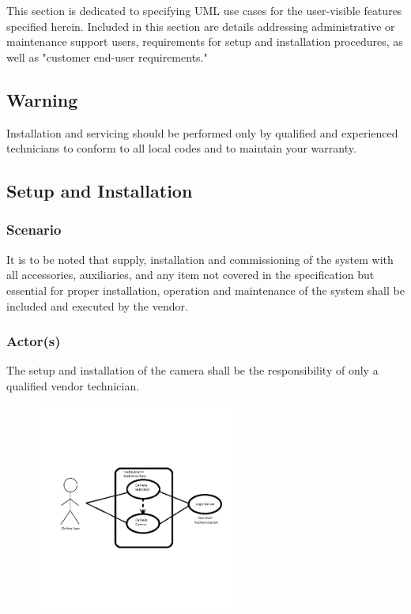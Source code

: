 This section is dedicated to specifying UML use cases for the user-visible features specified herein. Included in this section are details addressing administrative or maintenance support users, requirements for setup and installation procedures, as well as "customer end-user requirements."
\subsection{Warning}
Installation and servicing should be performed only by qualified and experienced technicians to conform to all local codes and to maintain your warranty.
\subsection{Setup and Installation}
\subsubsection{Scenario}
It is to be noted that supply, installation and commissioning of the system with all accessories, auxiliaries, and any item not covered in the specification but essential for proper installation, operation and maintenance of the system shall be included and executed by the vendor.
\subsubsection{Actor(s)}
The setup and installation of the camera shall be the responsibility of only a qualified vendor technician.
\vspace{0.5 in}
\begin{figure}[h!]
	\centering
   	\includegraphics[width=0.60\textwidth]{images/camera_operation_UML}
\end{figure}
\vspace{0.5 in}
